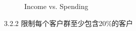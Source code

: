 \documentclass[8pt]{article}
\begin{document}
\begin{figure}[H]
\begin{minipage}{0.32\textwidth}
        \caption{Income vs. Spending}
        \label{fig: Annual Income vs. Spending Score k6 com con w}
    \end{minipage}
    \hfill
\end{figure}

3.2.2 限制每个客户群至少包含20\%的客户

\vspace{3em}
\end{document}
